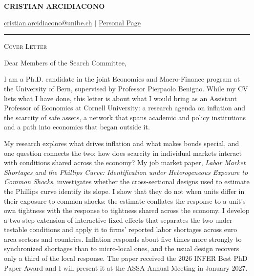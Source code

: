 \documentclass[11pt]{article}
\begin{document}
 
\begin{center}
    \textbf{\large \scshape CRISTIAN ARCIDIACONO}
\end{center}

\begin{center}
    {\href{mailto:cristian.arcidiacono@unibe.ch}{cristian.arcidiacono@unibe.ch} $\vert$ \href{https://sites.google.com/view/cristian-arcidiacono/home}{Personal Page}}
\end{center}
\vspace{-0.2cm}
\noindent\rule{\textwidth}{0.4pt}

\vspace{0.2cm}

\begin{center}
    {\large \scshape Cover Letter}
\end{center}

\vspace{0.3cm}

Dear Members of the Search Committee,

I am a Ph.D. candidate in the joint Economics and Macro-Finance program at the University of Bern, supervised by Professor Pierpaolo Benigno. While my CV lists what I have done, this letter is about what I would bring as an Assistant Professor of Economics at Cornell University: a research agenda on inflation and the scarcity of safe assets, a network that spans academic and policy institutions and a path into economics that began outside it.

My research explores what drives inflation and what makes bonds special, and one question connects the two: how does scarcity in individual markets interact with conditions shared across the economy? My job market paper, \textit{Labor Market Shortages and the Phillips Curve: Identification under Heterogeneous Exposure to Common Shocks}, investigates whether the cross-sectional designs used to estimate the Phillips curve identify its slope. I show that they do not when units differ in their exposure to common shocks: the estimate conflates the response to a unit's own tightness with the response to tightness shared across the economy. I develop a two-step extension of interactive fixed effects that separates the two under testable conditions and apply it to firms' reported labor shortages across euro area sectors and countries. Inflation responds about five times more strongly to synchronized shortages than to micro-local ones, and the usual design recovers only a third of the local response. The paper received the 2026 INFER Best PhD Paper Award and I will present it at the ASSA Annual Meeting in January 2027.
\end{document}
